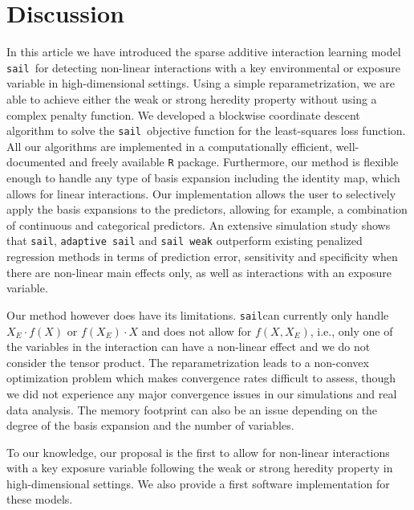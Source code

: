\documentclass[12pt,letter]{article}\usepackage[]{graphicx}\usepackage[]{color}
\newcommand{\sail}{\texttt{sail}}
\begin{document}
\section{Discussion} \label{sec:sail_discussion}

In this article we have introduced the sparse additive interaction learning model \sail ~for detecting non-linear interactions with a key environmental or exposure variable in high-dimensional settings. 
Using a simple reparametrization, we are able to achieve either the weak or strong heredity property without using a complex penalty function. We developed a blockwise coordinate descent algorithm to solve the \sail ~objective function for the least-squares loss function. 
All our algorithms are implemented in a computationally efficient, well-documented and freely available \texttt{R} package. 
Furthermore, our method is flexible enough to handle any type of basis expansion including the identity map, which allows for linear interactions. 
Our implementation allows the user to selectively apply the basis expansions to the predictors, allowing for example, a combination of continuous and categorical predictors. 
An extensive simulation study shows that \sail, \texttt{adaptive sail} and \texttt{sail weak} outperform existing penalized regression methods in terms of prediction error, sensitivity and specificity when there are non-linear main effects only, as well as interactions with an exposure variable. 

Our method however does have its limitations. \sail can currently only handle $X_E \cdot f(X)$ or $f(X_E) \cdot X$ and does not allow for $f(X, X_E)$, i.e., only one of the variables in the interaction can have a non-linear effect and we do not consider the tensor product. The reparametrization leads to a non-convex optimization problem which makes convergence rates difficult to assess, though we did not experience any major convergence issues in our simulations and real data analysis. The memory footprint can also be an issue depending on the degree of the basis expansion and the number of variables. 

To our knowledge, our proposal is the first to allow for non-linear interactions with a key exposure variable following the weak or strong heredity property in high-dimensional settings. We also provide a first software implementation for these models. 
\end{document}
